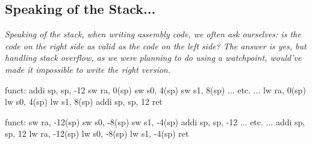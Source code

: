 \subsection{Speaking of the Stack...}
\textit{Speaking of the stack, when writing assembly code, we often ask ourselves: is the code on the right side as valid as the code on the left side? The answer is yes, but handling stack overflow, as we were planning to do using a watchpoint, would've made it impossible to write the right version.} \\
\begin{minipage}[htp]{0.45\textwidth}
\begin{assembly}
funct:
    addi sp, sp, -12
    sw   ra, 0(sp)
    sw   s0, 4(sp)
    sw   s1, 8(sp)
    ... etc. ...
    lw   ra, 0(sp)
    lw   s0, 4(sp)
    lw   s1, 8(sp)
    addi sp, sp, 12
    ret
\end{assembly}    
\end{minipage}
\hfill
\vline
\hfill
\begin{minipage}[htp]{0.45\textwidth}
\begin{assembly}
funct:
    sw   ra, -12(sp)
    sw   s0, -8(sp)
    sw   s1, -4(sp)
    addi sp, sp, -12
    ... etc. ...
    addi sp, sp, 12
    lw   ra, -12(sp)
    lw   s0, -8(sp)
    lw   s1, -4(sp)
    ret
\end{assembly}
\end{minipage}

